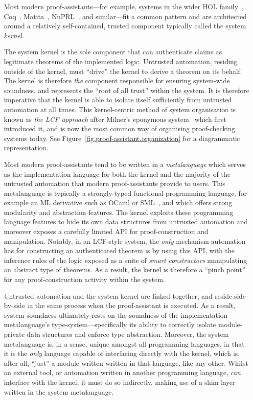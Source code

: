\documentclass[a4paper, UKenglish, cleveref, autoref, thm-restate, colorlinks]{lipics-v2021}
\begin{document}
Most modern proof-assistants---for example, systems in the wider HOL family~\cite{10.1007/s00165-019-00492-1, DBLP:conf/tphol/Harrison09a, DBLP:conf/tphol/SlindN08}, Coq~\cite{DBLP:conf/popl/HuetH14}, Matita~\cite{DBLP:conf/cade/AspertiRCT11}, NuPRL~\cite{DBLP:conf/cade/AllenCEKL00}, and similar---fit a common pattern and are architected around a relatively self-contained, trusted component typically called the system \emph{kernel}.

The system kernel is the sole component that can authenticate claims as legitimate theorems of the implemented logic.
Untrusted automation, residing outside of the kernel, must ``drive'' the kernel to derive a theorem on its behalf.
The kernel is therefore \emph{the} component responsible for ensuring system-wide soundness, and represents the ``root of all trust'' within the system.
It is therefore imperative that the kernel is able to isolate itself sufficiently from untrusted automation at all times.
This kernel-centric method of system organisation is known as \emph{the LCF approach} after Milner's eponymous system~\cite{DBLP:books/sp/Gordon79} which first introduced it, and is now the most common way of organising proof-checking systems today.
See Figure~\ref{fig.proof-assistant.organization} for a diagrammatic representation.

Most modern proof-assistants tend to be written in a \emph{metalanguage} which serves as the implementation language for both the kernel and the majority of the untrusted automation that modern proof-assistants provide to users.
This metalanguage is typically a strongly-typed functional programming language, for example an ML derivative such as OCaml or SML~\cite{DBLP:books/daglib/0069232}, and which offers strong modularity and abstraction features.
The kernel exploits these programming language features to hide its own data structures from untrusted automation and moreover exposes a carefully limited API for proof-construction and manipulation.
Notably, in an LCF-style system, the \emph{only} mechanism automation has for constructing an authenticated theorem is by using this API, with the inference rules of the logic exposed as a suite of \emph{smart constructors} manipulating an abstract type of theorems.
As a result, the kernel is therefore a ``pinch point'' for any proof-construction activity within the system.

Untrusted automation and the system kernel are linked together, and reside side-by-side in the same process when the proof-assistant is executed.
As a result, system soundness ultimately rests on the soundness of the implementation metalanguage's type-system---specifically its ability to correctly isolate module-private data structures and enforce type abstraction.
Moreover, the system metalanguage is, in a sense, unique amongst all programming languages, in that it is the \emph{only} language capable of interfacing directly with the kernel, which is, after all, ``just'' a module written written in that language, like any other.
Whilst an external tool, or automation written in another programming language, \emph{can} interface with the kernel, it must do so indirectly, making use of a shim layer written in the system metalanguage.
\end{document}
